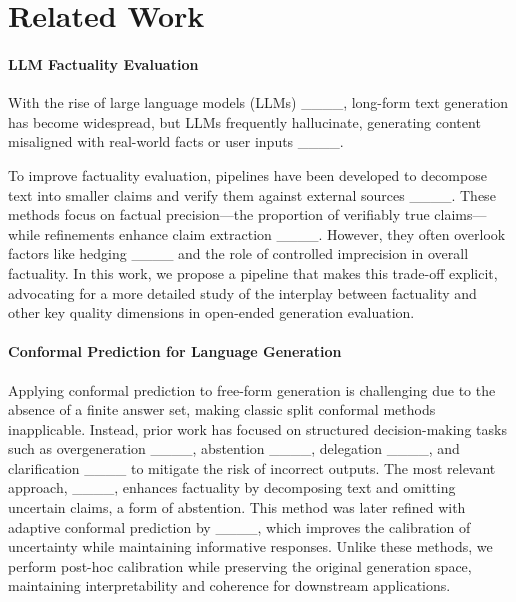 \section{Related Work}
\paragraph{LLM Factuality Evaluation} With the rise of large language models (LLMs) ____, long-form text generation has become widespread, but LLMs frequently hallucinate, generating content misaligned with real-world facts or user inputs ____.

To improve factuality evaluation, pipelines have been developed to decompose text into smaller claims and verify them against external sources ____. These methods focus on factual precision—the proportion of verifiably true claims—while refinements enhance claim extraction ____. However, they often overlook factors like hedging ____ and the role of controlled imprecision in overall factuality.
In this work, we propose a pipeline that makes this trade-off explicit, advocating for a more detailed study of the interplay between factuality and other key quality dimensions in open-ended generation evaluation.


\paragraph{Conformal Prediction for Language Generation} Applying conformal prediction to free-form generation is challenging due to the absence of a finite answer set, making classic split conformal methods inapplicable. Instead, prior work has focused on structured decision-making tasks such as overgeneration ____, abstention ____, delegation ____, and clarification ____ to mitigate the risk of incorrect outputs. The most relevant approach, ____, enhances factuality by decomposing text and omitting uncertain claims, a form of abstention. This method was later refined with adaptive conformal prediction by ____, which improves the calibration of uncertainty while maintaining informative responses. Unlike these methods, we perform post-hoc calibration while preserving the original generation space, maintaining interpretability and coherence for downstream applications.

